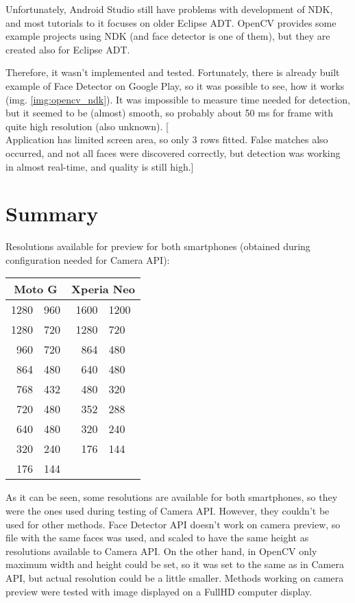Unfortunately, Android Studio still have problems with development of NDK, and
most tutorials to it focuses on older Eclipse ADT. 
OpenCV provides some example projects using NDK (and face detector is one of
them), but they are created also for Eclipse ADT.

Therefore, it wasn't implemented and tested. 
Fortunately, there is already built example of Face Detector on Google Play, so
it was possible to see, how it works (img. \ref{img:opencv_ndk}). 
It was impossible to measure time needed for
detection, but it seemed to be (almost) smooth, so probably about 50 ms for
frame with quite high resolution (also unknown).
[\\Application has limited screen area, so only 3 rows fitted. False matches
also occurred, and not all faces were discovered correctly, but detection was
working in almost real-time, and quality is still high.]

\section{Summary}

Resolutions available for preview for both smartphones (obtained during
configuration needed for Camera API):
\begin{center}
\begin{tabular}{r@{ x }l|r@{ x }l}
\multicolumn{2}{c|}{Moto G} & \multicolumn{2}{c}{Xperia Neo} \\
\hline
1280 & 960 & 1600 & 1200 \\
1280 & 720 & 1280 & 720 \\
960 & 720 & 864 & 480 \\
864 & 480 & 640 & 480 \\
768 & 432 & 480 & 320 \\
720 & 480 & 352 & 288 \\
640 & 480 & 320 & 240 \\
320 & 240 & 176 & 144 \\
176 & 144 \\
\end{tabular}
\end{center}
As it can be seen, some resolutions are available for both smartphones, so they
were the ones used during testing of Camera API. 
However, they couldn't be used for other methods.
Face Detector API doesn't work on camera preview, so file with the same faces
was used, and scaled to have the same height as resolutions available to Camera API. 
On the other hand, in OpenCV only maximum width and height could be set, so it
was set to the same as in Camera API, but actual resolution could be a little
smaller.
Methods working on camera preview were tested with image displayed on a FullHD
computer display.

